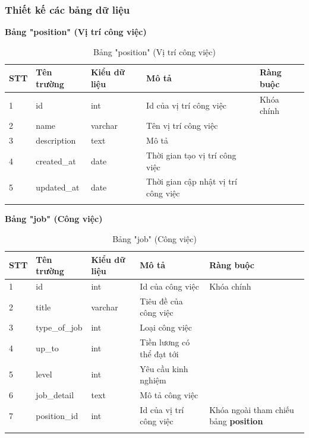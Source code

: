 \documentclass[../DoAn.tex]{subfiles}
\begin{document}
\subsubsection{Thiết kế các bảng dữ liệu}
\textbf{Bảng "position" (Vị trí công việc)}
\begin{longtable}{|p{}|p{}|p{}|p{}|p{}|}
\hline
\textbf{STT} & \textbf{Tên trường} & \textbf{Kiểu dữ liệu} & \textbf{Mô tả } & \textbf{Ràng buộc} \\ \hline
1   & id & int & Id của vị trí công việc & Khóa chính \\ \hline
2   & name & varchar & Tên vị trí công việc & \\ \hline
3   & description & text & Mô tả & \\ \hline
4   & created\_at & date & Thời gian tạo vị trí công việc & \\ \hline
5   & updated\_at & date & Thời gian cập nhật vị trí công việc & \\ \hline
\caption{Bảng "position" (Vị trí công việc)}
\end{longtable}

\textbf{Bảng "job" (Công việc)}
\begin{longtable}{|p{}|p{}|p{}|p{}|p{}|}
\hline
\textbf{STT} & \textbf{Tên trường} & \textbf{Kiểu dữ liệu} & \textbf{Mô tả } & \textbf{Ràng buộc} \\ \hline
1   & id & int & Id của công việc & Khóa chính \\ \hline
2   & title & varchar & Tiêu đề của công việc & \\ \hline
3   & type\_of\_job & int & Loại công việc & \\ \hline
4   & up\_to & int & Tiền lương có thể đạt tới & \\ \hline
5   & level & int & Yêu cầu kinh nghiệm & \\ \hline
6   & job\_detail & text & Mô tả công việc & \\ \hline
7   & position\_id & int & Id của vị trí công việc & Khóa ngoài tham chiếu bảng \textbf{position} \\ \hline
\caption{Bảng "job" (Công việc)}
\end{longtable}
\end{document}
